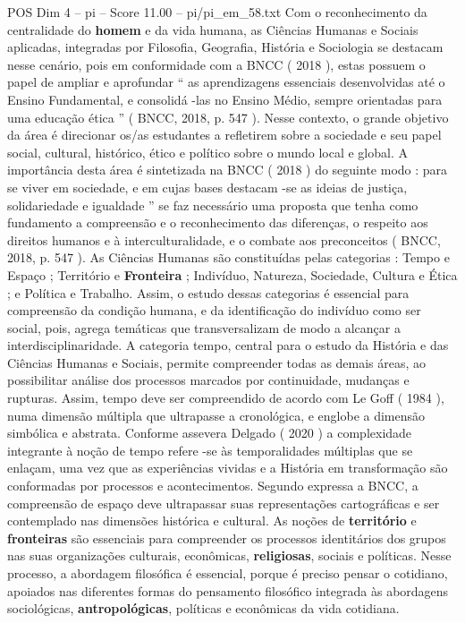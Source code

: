 \begin{textsample}{POS Dim 4 – pi – Score 11.00 – pi/pi\_em\_58.txt}
Com o reconhecimento da centralidade do \textbf{homem} e da vida humana, as Ciências Humanas e Sociais aplicadas, integradas por Filosofia, Geografia, História e Sociologia se destacam nesse cenário, pois em conformidade com a BNCC ( 2018 ), estas possuem o papel de ampliar e aprofundar “ as aprendizagens essenciais desenvolvidas até o Ensino Fundamental, e consolidá -las no Ensino Médio, sempre orientadas para uma educação ética ” ( BNCC, 2018, p. 547 ).
Nesse contexto, o grande objetivo da área é direcionar os/as estudantes a refletirem sobre a sociedade e seu papel social, cultural, histórico, ético e político sobre o mundo local e global.
A importância desta área é sintetizada na BNCC ( 2018 ) do seguinte modo : para se viver em sociedade, e em cujas bases destacam -se as ideias de justiça, solidariedade e igualdade ” se faz necessário uma proposta que tenha como fundamento a compreensão e o reconhecimento das diferenças, o respeito aos direitos humanos e à interculturalidade, e o combate aos preconceitos ( BNCC, 2018, p. 547 ).
As Ciências Humanas são constituídas pelas categorias : Tempo e Espaço ; Território e \textbf{Fronteira} ; Indivíduo, Natureza, Sociedade, Cultura e Ética ; e Política e Trabalho.
Assim, o estudo dessas categorias é essencial para compreensão da condição humana, e da identificação do indivíduo como ser social, pois, agrega temáticas que transversalizam de modo a alcançar a interdisciplinaridade.
A categoria tempo, central para o estudo da História e das Ciências Humanas e Sociais, permite compreender todas as demais áreas, ao possibilitar análise dos processos marcados por continuidade, mudanças e rupturas.
Assim, tempo deve ser compreendido de acordo com Le Goff ( 1984 ), numa dimensão múltipla que ultrapasse a cronológica, e englobe a dimensão simbólica e abstrata.
Conforme assevera Delgado ( 2020 ) a complexidade integrante à noção de tempo refere -se às temporalidades múltiplas que se enlaçam, uma vez que as experiências vividas e a História em transformação são conformadas por processos e acontecimentos.
Segundo expressa a BNCC, a compreensão de espaço deve ultrapassar suas representações cartográficas e ser contemplado nas dimensões histórica e cultural.
As noções de \textbf{território} e \textbf{fronteiras} são essenciais para compreender os processos identitários dos grupos nas suas organizações culturais, econômicas, \textbf{religiosas}, sociais e políticas.
Nesse processo, a abordagem filosófica é essencial, porque é preciso pensar o cotidiano, apoiados nas diferentes formas do pensamento filosófico integrada às abordagens sociológicas, \textbf{antropológicas}, políticas e econômicas da vida cotidiana.

\end{textsample}
